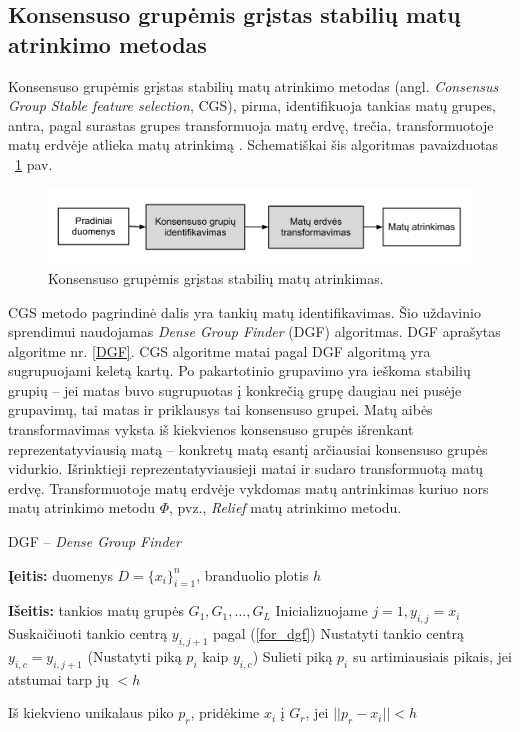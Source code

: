 \subsection{Konsensuso grupėmis grįstas stabilių matų atrinkimo metodas}

Konsensuso grupėmis grįstas stabilių matų atrinkimo metodas (angl. \textit{Consensus Group Stable feature selection}, CGS), pirma, identifikuoja tankias matų grupes, antra, pagal surastas grupes transformuoja matų erdvę, trečia, transformuotoje matų erdvėje atlieka matų atrinkimą \cite{loscalzo2009consensus}. Schematiškai šis algoritmas pavaizduotas ~\ref{fig:figure7} pav. 
\begin{figure}
 \centering
 \includegraphics[width=\textwidth]{../bachelor/images/consensus_group_based_feature_selection_framework.pdf}
 \caption{Konsensuso grupėmis grįstas stabilių matų atrinkimas.}
 \label{fig:figure7}
\end{figure}

CGS metodo pagrindinė dalis yra tankių matų identifikavimas. Šio uždavinio sprendimui naudojamas \textit{Dense Group Finder} (DGF) algoritmas. DGF aprašytas algoritme nr. \ref{DGF}. CGS algoritme matai pagal DGF algoritmą yra sugrupuojami keletą kartų. Po pakartotinio grupavimo yra ieškoma stabilių grupių -- jei matas buvo sugrupuotas į konkrečią grupę daugiau nei pusėje grupavimų, tai matas ir priklausys tai konsensuso grupei. Matų aibės transformavimas vyksta iš kiekvienos konsensuso grupės išrenkant reprezentatyviausią matą -- konkretų matą esantį arčiausiai konsensuso grupės vidurkio. Išrinktieji reprezentatyviausieji matai ir sudaro transformuotą matų erdvę. Transformuotoje matų erdvėje vykdomas matų antrinkimas kuriuo nors matų atrinkimo metodu $\Phi$, pvz., \textit{Relief} matų atrinkimo metodu. 
\begin{algorithm}
\caption{DGF -- \textit{Dense Group Finder}}
\label{DGF}
 \begin{algorithmic}
 \item \textbf{Įeitis:} duomenys $D=\{x_i\}_{i=1}^n$, branduolio plotis $h$
 \item \textbf{Išeitis:} tankios matų grupės $G_1, G_1,..., G_L$
  \State Inicializuojame $j=1, y_{i,j}=x_i$
  \Repeat
    \State Suskaičiuoti tankio centrą $y_{i, j+1}$ pagal (\ref{for_dgf})
  \State Nustatyti tankio centrą $y_{i,c} = y_{i,j+1}$ (Nustatyti piką $p_i$ kaip $y_{i,c}$)
  \State Sulieti piką $p_i$ su artimiausiais pikais, jei atstumai tarp jų $ < h$
 \EndFor
 \item Iš kiekvieno unikalaus piko $p_r$, pridėkime $x_i$ į $G_r$, jei $||p_r - x_i|| < h$
 \end{algorithmic}
\end{algorithm}

